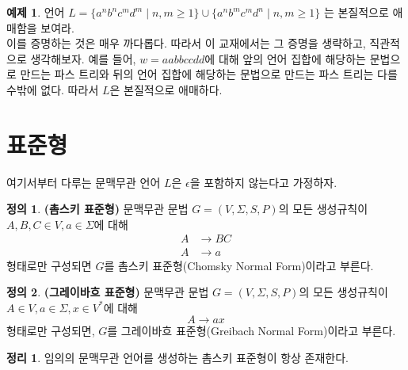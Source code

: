 \documentclass[b5paper]{book}
\theoremstyle{definition}
\newtheorem{defn}{정의}[chapter]
\newtheorem{thm}{정리}[chapter]
\newtheorem{ex}{예제}[chapter]
\begin{document}
\begin{ex}
    언어 $L = \{a^nb^nc^md^m \; \vert \; n,m \ge 1\} \cup \{a^nb^mc^md^n \; \vert \; n,m \ge 1\}$
    는 본질적으로 애매함을 보여라. \\ 
     이를 증명하는 것은 매우 까다롭다. 따라서 이 교재에서는 그 증명을 생략하고, 직관적으로 생각해보자.
    예를 들어, $w = aabbccdd$에 대해 앞의 언어 집합에 해당하는 문법으로 만드는 파스 트리와
    뒤의 언어 집합에 해당하는 문법으로 만드는 파스 트리는 다를 수밖에 없다. 
    따라서 $L$은 본질적으로 애매하다.
\end{ex}
\section{표준형}
여기서부터 다루는 문맥무관 언어 $L$은 $\epsilon$을 포함하지 않는다고 가정하자. 
\begin{defn}
    \textbf{(촘스키 표준형)} 문맥무관 문법 $G = (V, \Sigma, S, P)$의 모든
    생성규칙이 $A, B, C \in V, a \in \Sigma$에 대해 
    \begin{align*}
        A &\rightarrow BC \\ 
        A &\rightarrow a 
    \end{align*}
    형태로만 구성되면 $G$를 촘스키 표준형(Chomsky Normal Form)이라고 부른다. 
\end{defn}
\begin{defn}
    \textbf{(그레이바흐 표준형)} 문맥무관 문법 $G = (V, \Sigma, S,P)$의 모든
    생성규칙이 $A\in V, a\in\Sigma , x \in V^*$에 대해
    $$A \rightarrow ax$$
    형태로만 구성되면, $G$를 그레이바흐 표준형(Greibach Normal Form)이라고 부른다.
\end{defn}
\begin{thm}
    임의의 문맥무관 언어를 생성하는 촘스키 표준형이 항상 존재한다. 
\end{thm}
\end{document}

